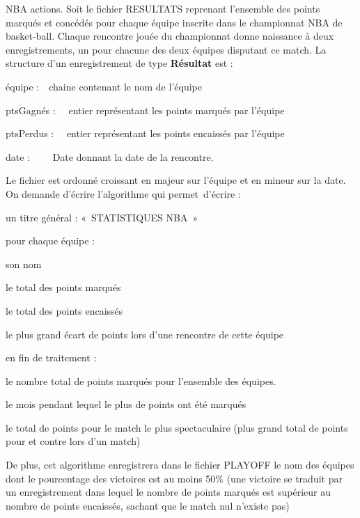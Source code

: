 \begin{Exercice}{NBA actions.}
	Soit le fichier RESULTATS reprenant l’ensemble des points marqués et
	concédés pour chaque équipe inscrite dans le championnat NBA de
	basket-ball. Chaque rencontre jouée du championnat donne naissance à
	deux enregistrements, un pour chacune des deux équipes disputant ce
	match. La structure d’un enregistrement de type \textbf{Résultat} est
	:

	{	équipe :\ \ chaine contenant le nom de l’équipe}

	{	ptsGagnés : \ \ entier représentant les points marqués par l’équipe}

	{	ptsPerdus : \ \ entier représentant les points encaissés par l’équipe}

	{	date : \ \ \ \ Date donnant la date de la rencontre.}

	
	Le fichier est ordonné croissant en majeur sur l'équipe
	et en mineur sur la date. On demande d’écrire l’algorithme qui
	permet~d’écrire :

	\begin{liste}
		\item 
			un titre général : «~STATISTIQUES NBA~»
		\item 
			pour chaque équipe :
			\begin{liste}
				\item 
					son nom 
				\item 
					le total des points marqués
				\item 
					le total des points encaissés
				\item 
					le plus grand écart de points lors d’une rencontre de cette équipe
			\end{liste}
		\item 
			en fin de traitement :
			\begin{liste}
				\item 
					le nombre total de points marqués pour l’ensemble des équipes.
				\item 
					le mois pendant lequel le plus de points ont été marqués
				\item 
					le total de points pour le match le plus spectaculaire (plus grand total
					de points pour et contre lors d’un match)
			\end{liste}
	\end{liste}
	
	De plus, cet algorithme enregistrera dans le fichier PLAYOFF le nom des
	équipes dont le pourcentage des victoires est au moins 50\% (une
	victoire se traduit par un enregistrement dans lequel le nombre de
	points marqués est supérieur au nombre de points encaissés, sachant que
	le match nul n’existe pas)
\end{Exercice}

